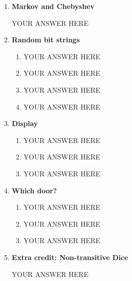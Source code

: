 \documentclass[12pt,fleqn]{article}
\begin{document}
\begin{enumerate}
\begin{enumerate}
    \end{enumerate}
  
  
  \newpage
  \item \textbf{Markov and Chebyshev}
  
  YOUR ANSWER HERE
  
  
  \newpage
  \item \textbf{Random bit strings}
  
  \begin{enumerate}
    \item 
    YOUR ANSWER HERE
    
    \item 
    YOUR ANSWER HERE
    
    \item 
    YOUR ANSWER HERE
    
    \item
    YOUR ANSWER HERE
      
  \end{enumerate}
  
  
  \newpage
  \item \textbf{Display}
 
    \begin{enumerate}
      \item 
      YOUR ANSWER HERE
    
      \item 
      YOUR ANSWER HERE
    
      \item 
      YOUR ANSWER HERE
      
    \end{enumerate}
  
  
  \newpage
  \item \textbf{Which door?}
  
    \begin{enumerate}
      \item 
      YOUR ANSWER HERE
    
      \item 
      YOUR ANSWER HERE
    
      \item 
      YOUR ANSWER HERE
      
    \end{enumerate}
  
  
  \newpage
  \item \textbf{Extra credit: Non-transitive Dice}
  
  YOUR ANSWER HERE


\end{enumerate}
\end{document}
